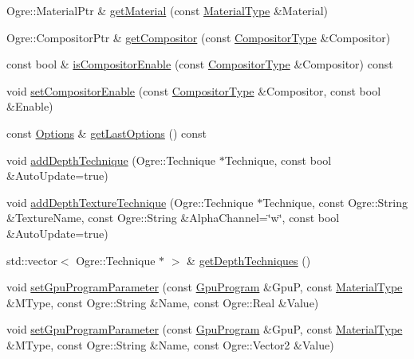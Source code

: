 \begin{CompactItemize}
\begin{CompactItemize}
Ogre::MaterialPtr \& \hyperlink{class_hydrax_1_1_material_manager_648e7cd626194ea34c31a4bf422cdf4d}{getMaterial} (const \hyperlink{class_hydrax_1_1_material_manager_cffd193405105e0f9f528cee40fdad15}{MaterialType} \&Material)
\item 
Ogre::CompositorPtr \& \hyperlink{class_hydrax_1_1_material_manager_e72ebb13cf760e473c8fdad10410fcc7}{getCompositor} (const \hyperlink{class_hydrax_1_1_material_manager_9ec2b5e6a97ef7589119e888a7a32174}{CompositorType} \&Compositor)
\item 
const bool \& \hyperlink{class_hydrax_1_1_material_manager_f2ede2086a254c2bf07afd42227b9f31}{isCompositorEnable} (const \hyperlink{class_hydrax_1_1_material_manager_9ec2b5e6a97ef7589119e888a7a32174}{CompositorType} \&Compositor) const 
\item 
void \hyperlink{class_hydrax_1_1_material_manager_61bccef34841ce9c0ce6c53ff27f136b}{setCompositorEnable} (const \hyperlink{class_hydrax_1_1_material_manager_9ec2b5e6a97ef7589119e888a7a32174}{CompositorType} \&Compositor, const bool \&Enable)
\item 
const \hyperlink{struct_hydrax_1_1_material_manager_1_1_options}{Options} \& \hyperlink{class_hydrax_1_1_material_manager_3237e8772cce892c16501aa910639b07}{getLastOptions} () const 
\item 
void \hyperlink{class_hydrax_1_1_material_manager_b70527e20f62a739a738773173c7966f}{addDepthTechnique} (Ogre::Technique $\ast$Technique, const bool \&AutoUpdate=true)
\item 
void \hyperlink{class_hydrax_1_1_material_manager_0ee548c5ba041a7e26a1561dbac28ae4}{addDepthTextureTechnique} (Ogre::Technique $\ast$Technique, const Ogre::String \&TextureName, const Ogre::String \&AlphaChannel=\char`\"{}w\char`\"{}, const bool \&AutoUpdate=true)
\item 
std::vector$<$ Ogre::Technique $\ast$ $>$ \& \hyperlink{class_hydrax_1_1_material_manager_964a29c17a27037791f2b1c76bdf2aea}{getDepthTechniques} ()
\item 
void \hyperlink{class_hydrax_1_1_material_manager_f5f8e190d3e26cca04d8503e947ffba5}{setGpuProgramParameter} (const \hyperlink{class_hydrax_1_1_material_manager_a0cfb2fce7a409771c0751d04afa2514}{GpuProgram} \&GpuP, const \hyperlink{class_hydrax_1_1_material_manager_cffd193405105e0f9f528cee40fdad15}{MaterialType} \&MType, const Ogre::String \&Name, const Ogre::Real \&Value)
\item 
void \hyperlink{class_hydrax_1_1_material_manager_fca345e734a82f62917358eef8c8ea34}{setGpuProgramParameter} (const \hyperlink{class_hydrax_1_1_material_manager_a0cfb2fce7a409771c0751d04afa2514}{GpuProgram} \&GpuP, const \hyperlink{class_hydrax_1_1_material_manager_cffd193405105e0f9f528cee40fdad15}{MaterialType} \&MType, const Ogre::String \&Name, const Ogre::Vector2 \&Value)

\end{CompactItemize}
\end{CompactItemize}
